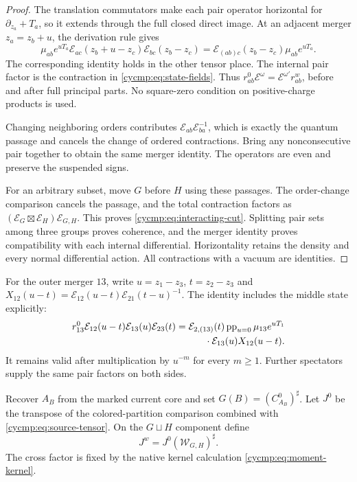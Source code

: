 \begin{proof}
The translation commutators make each pair operator horizontal for
$\partial_{z_a}+T_a$, so it extends through the full closed direct
image. At an adjacent merger $z_a=z_b+u$, the derivation rule gives
\[
 \mu_{ab}e^{uT_a}
 \mathcal E_{ac}(z_b+u-z_c)\mathcal E_{bc}(z_b-z_c)
 =\mathcal E_{(ab)c}(z_b-z_c)\mu_{ab}e^{uT_a}.
\]
The corresponding identity holds in the other tensor place.
The internal pair factor is the contraction in
\eqref{cycmp:eq:state-fields}. Thus
$r^0_{ab}\mathcal E^\omega
=\mathcal E^{\omega'}r^w_{ab}$, before and after full principal
parts. No square-zero condition on positive-charge products is used.

Changing neighboring orders contributes
$\mathcal E_{ab}\mathcal E_{ba}^{-1}$, which is exactly the
quantum passage and cancels the change of ordered contractions.
Bring any nonconsecutive pair together to obtain the same merger
identity. The operators are even and preserve the suspended signs.

For an arbitrary subset, move $G$ before $H$ using these passages.
The order-change comparison cancels the passage, and the total
contraction factors as
$(\mathscr E_G\boxtimes\mathscr E_H)\mathcal E_{G,H}$.
This proves \eqref{cycmp:eq:interacting-cut}. Splitting pair sets
among three groups proves coherence, and the merger identity proves
compatibility with each internal differential. Horizontality retains
the density and every normal differential action. All contractions
with a vacuum are identities.
\end{proof}

For the outer merger $13$, write $u=z_1-z_3$, $t=z_2-z_3$ and
$X_{12}(u-t)=\mathcal E_{12}(u-t)\mathcal E_{21}(t-u)^{-1}$.
The identity includes the middle state explicitly:
\begin{equation}\label{cycmp:eq:interacting-outer}
 \begin{split}
 r^0_{13}\mathcal E_{12}(u-t)\mathcal E_{13}(u)\mathcal E_{23}(t)
 ={}&\mathcal E_{2,(13)}(t)\operatorname{pp}_{u=0}\mu_{13}e^{uT_1}\\
 &\hspace{6mm}\cdot\mathcal E_{13}(u)X_{12}(u-t).
 \end{split}
\end{equation}
It remains valid after multiplication by $u^{-m}$ for every $m\ge1$.
Further spectators supply the same pair factors on both sides.

Recover $A_B$ from the marked current core and set
$G(B)=(C_{A_B}^0)^\sharp$. Let $J^0$ be the transpose of the
colored-partition comparison combined with
\eqref{cycmp:eq:source-tensor}. On the $G\sqcup H$ component define
\begin{equation}\label{cycmp:eq:interacting-tensorator}
 J^w=J^0(\mathcal W_{G,H})^\sharp.
\end{equation}
The cross factor is fixed by the native kernel calculation
\eqref{cycmp:eq:moment-kernel}.

